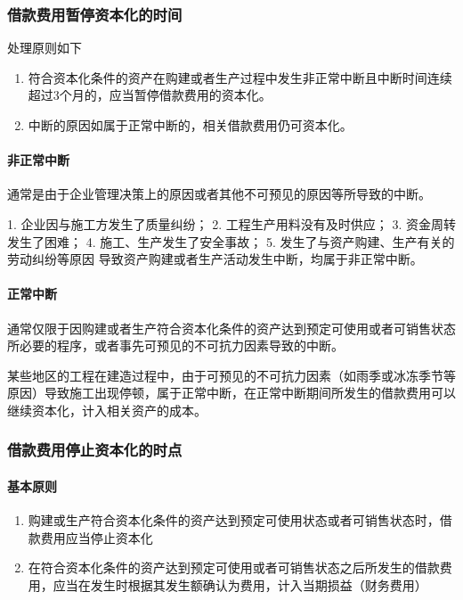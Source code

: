 \documentclass[UTF8,12pt]{ctexart}
\numberwithin{equation}{section} %
\numberwithin{figure}{section}
\numberwithin{table}{section}
\begin{document}
	\subsubsection{借款费用暂停资本化的时间}
	处理原则如下
	\begin{enumerate}
		\item 符合资本化条件的资产在购建或者生产过程中发生非正常中断且中断时间连续超过3个月的，应当暂停借款费用的资本化。
		
		\item 中断的原因如属于正常中断的，相关借款费用仍可资本化。
	\end{enumerate}
	
	\paragraph{非正常中断}通常是由于企业管理决策上的原因或者其他不可预见的原因等所导致的中断。
	
	1.	企业因与施工方发生了质量纠纷；
	2.	工程生产用料没有及时供应；
	3.	资金周转发生了困难；
	4.	施工、生产发生了安全事故；
	5.	发生了与资产购建、生产有关的劳动纠纷等原因
	导致资产购建或者生产活动发生中断，均属于非正常中断。
	
	
	\paragraph{正常中断}通常仅限于因购建或者生产符合资本化条件的资产达到预定可使用或者可销售状态所必要的程序，或者事先可预见的不可抗力因素导致的中断。
	
	某些地区的工程在建造过程中，由于可预见的不可抗力因素（如雨季或冰冻季节等原因）导致施工出现停顿，属于正常中断，在正常中断期间所发生的借款费用可以继续资本化，计入相关资产的成本。
	
	\subsubsection{借款费用停止资本化的时点}
	\paragraph{基本原则}
	\begin{enumerate}
		\item 购建或生产符合资本化条件的资产达到预定可使用状态或者可销售状态时，借款费用应当停止资本化
		
		\item 在符合资本化条件的资产达到预定可使用或者可销售状态之后所发生的借款费用，应当在发生时根据其发生额确认为费用，计入当期损益（财务费用）
	\end{enumerate}
\end{document}
